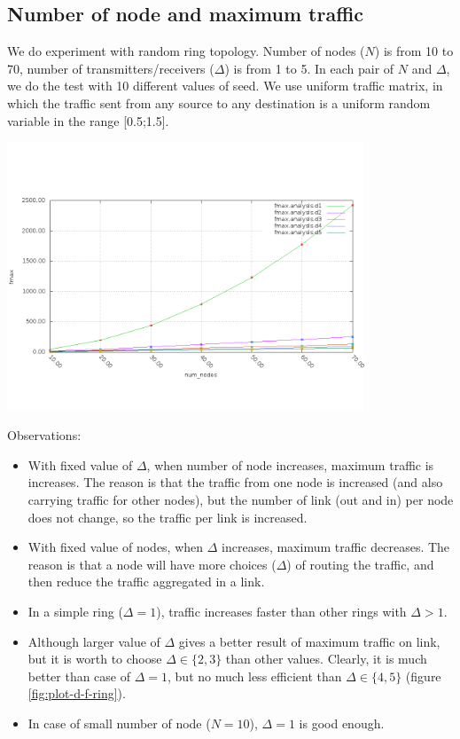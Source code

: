 \documentclass[a4paper]{article}
\begin{document}
  \subsection{Number of node and maximum traffic}
  We do experiment with random ring topology. Number of nodes ($N$) is from 10 to 70, number of transmitters/receivers ($\Delta$) is from 1 to 5. In each pair of $N$ and $\Delta$, we do the test with 10 different values of seed. We use uniform traffic matrix, in which the traffic sent from any source to any destination is a uniform random variable in the range [0.5;1.5].
    \begin{center}
    \includegraphics[width=0.8\textwidth]{random-ring-results/plot_n_f.png}
    \label{fig:plot-n-f}
    \end{center}
  Observations:
  \begin{itemize}
  	\item With fixed value of $\Delta$, when number of node increases, maximum traffic is increases. The reason is that the traffic from one node is increased (and also carrying traffic for other nodes), but the number of link (out and in) per node does not change, so the traffic per link is increased.
  	\item With fixed value of nodes, when $\Delta$ increases, maximum traffic decreases. The reason is that a node will have more choices ($\Delta$) of routing the traffic, and then reduce the traffic aggregated in a link. 
  	\item In a simple ring ($\Delta = 1$), traffic increases faster than other rings with $\Delta > 1$. 
  	\item Although larger value of $\Delta$ gives a better result of maximum traffic on link, but it is worth to choose $\Delta \in \{2,3\}$ than other values. Clearly, it is much better than case of $\Delta = 1$, but no much less efficient than $\Delta \in \{4, 5\}$ (figure \ref{fig:plot-d-f-ring}).
  	\item In case of small number of node ($N = 10$), $\Delta = 1$ is good enough.
  \end{itemize}
\end{document}
